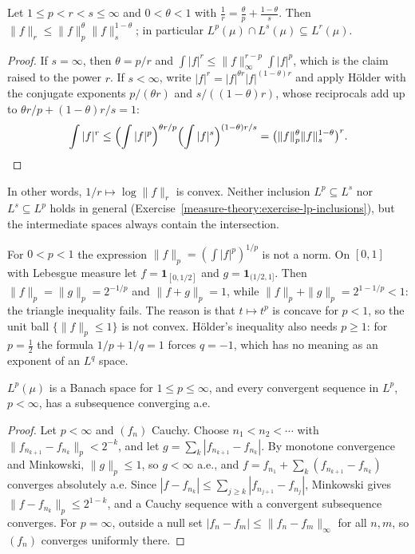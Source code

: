 \begin{proposition}\label{measure-theory:proposition-lp-interpolation}
Let $1 \leq p < r < s \leq \infty$ and $0 < \theta < 1$ with $\frac1r = \frac\theta p + \frac{1 - \theta}s$. Then $\|f\|_r \leq \|f\|_p^\theta\|f\|_s^{1 - \theta}$; in particular
$L^p(\mu) \cap L^s(\mu) \subseteq L^r(\mu)$.
\end{proposition}

\begin{proof}
If $s = \infty$, then $\theta = p/r$ and $\int|f|^r \leq \|f\|_\infty^{r - p}\int|f|^p$, which is the claim raised to the power $r$. If $s < \infty$, write $|f|^r = |f|^{\theta r}|f|^{(1 - \theta)r}$ and apply
H\"older with the conjugate exponents $p/(\theta r)$ and $s/((1 - \theta)r)$, whose reciprocals add up to $\theta r/p + (1 - \theta)r/s = 1$:
\[
\int|f|^r \leq \Bigl(\int|f|^p\Bigr)^{\theta r/p}\Bigl(\int|f|^s\Bigr)^{(1 - \theta)r/s} = \bigl(\|f\|_p^\theta\|f\|_s^{1 - \theta}\bigr)^r.
\]
\end{proof}

In other words, $1/r \mapsto \log\|f\|_r$ is convex. Neither inclusion $L^p \subseteq L^s$ nor $L^s \subseteq L^p$ holds in general (Exercise~\ref{measure-theory:exercise-lp-inclusions}), but the
intermediate spaces always contain the intersection.

\begin{counterexample}\label{measure-theory:counterexample-p-less-than-one}
For $0 < p < 1$ the expression $\|f\|_p = (\int|f|^p)^{1/p}$ is not a norm. On $[0, 1]$ with Lebesgue measure let $f = \mathbf{1}_{[0, 1/2]}$ and $g = \mathbf{1}_{(1/2, 1]}$. Then
$\|f\|_p = \|g\|_p = 2^{-1/p}$ and $\|f + g\|_p = 1$, while $\|f\|_p + \|g\|_p = 2^{1 - 1/p} < 1$: the triangle inequality fails. The reason is that $t \mapsto t^p$ is concave for $p < 1$, so the unit
ball $\{\|f\|_p \leq 1\}$ is not convex. H\"older's inequality also needs $p \geq 1$: for $p = \frac12$ the formula $1/p + 1/q = 1$ forces $q = -1$, which has no meaning as an exponent of an $L^q$ space.
\end{counterexample}

\begin{theorem}\label{measure-theory:theorem-riesz-fischer}
$L^p(\mu)$ is a Banach space for $1 \leq p \leq \infty$, and every convergent sequence in $L^p$, $p < \infty$, has a subsequence converging a.e.
\end{theorem}

\begin{proof}
Let $p < \infty$ and $(f_n)$ Cauchy. Choose $n_1 < n_2 < \cdots$ with $\|f_{n_{k+1}} - f_{n_k}\|_p < 2^{-k}$, and let $g = \sum_k|f_{n_{k+1}} - f_{n_k}|$. By monotone convergence and Minkowski,
$\|g\|_p \leq 1$, so $g < \infty$ a.e., and $f = f_{n_1} + \sum_k(f_{n_{k+1}} - f_{n_k})$ converges absolutely a.e. Since $|f - f_{n_k}| \leq \sum_{j \geq k}|f_{n_{j+1}} - f_{n_j}|$, Minkowski gives
$\|f - f_{n_k}\|_p \leq 2^{1-k}$, and a Cauchy sequence with a convergent subsequence converges. For $p = \infty$, outside a null set $|f_n - f_m| \leq \|f_n - f_m\|_\infty$ for all $n, m$, so $(f_n)$ converges
uniformly there.
\end{proof}

